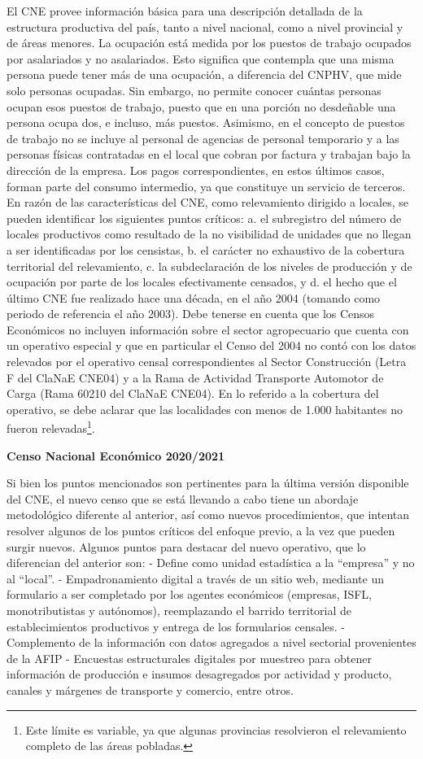 \documentclass[
  openany]{book}
\begin{document}
El CNE provee información básica para una descripción detallada de la estructura productiva del país, tanto a nivel nacional, como a nivel provincial y de áreas menores.
La ocupación está medida por los puestos de trabajo ocupados por asalariados y no asalariados.
Esto significa que contempla que una misma persona puede tener más de una ocupación, a diferencia del CNPHV, que mide solo personas ocupadas.
Sin embargo, no permite conocer cuántas personas ocupan esos puestos de trabajo, puesto que en una porción no desdeñable una persona ocupa dos, e incluso, más puestos.
Asimismo, en el concepto de puestos de trabajo no se incluye al personal de agencias de personal temporario y a las personas físicas contratadas en el local que cobran por factura y trabajan bajo la dirección de la empresa.
Los pagos correspondientes, en estos últimos casos, forman parte del consumo intermedio, ya que constituye un servicio de terceros.
En razón de las características del CNE, como relevamiento dirigido a locales, se pueden identificar los siguientes puntos críticos: a.
el subregistro del número de locales productivos como resultado de la no visibilidad de unidades que no llegan a ser identificadas por los censistas, b.
el carácter no exhaustivo de la cobertura territorial del relevamiento, c.
la subdeclaración de los niveles de producción y de ocupación por parte de los locales efectivamente censados, y d.
el hecho que el último CNE fue realizado hace una década, en el año 2004 (tomando como periodo de referencia el año 2003).
Debe tenerse en cuenta que los Censos Económicos no incluyen información sobre el sector agropecuario que cuenta con un operativo especial y que en particular el Censo del 2004 no contó con los datos relevados por el operativo censal correspondientes al Sector Construcción (Letra F del ClaNaE CNE04) y a la Rama de Actividad Transporte Automotor de Carga (Rama 60210 del ClaNaE CNE04).
En lo referido a la cobertura del operativo, se debe aclarar que las localidades con menos de 1.000 habitantes no fueron relevadas\footnote{Este límite es variable, ya que algunas provincias resolvieron el relevamiento completo de las áreas pobladas.}.

\textbf{Censo Nacional Económico 2020/2021}

Si bien los puntos mencionados son pertinentes para la última versión disponible del CNE, el nuevo censo que se está llevando a cabo tiene un abordaje metodológico diferente al anterior, así como nuevos procedimientos, que intentan resolver algunos de los puntos críticos del enfoque previo, a la vez que pueden surgir nuevos.
Algunos puntos para destacar del nuevo operativo, que lo diferencian del anterior son: - Define como unidad estadística a la ``empresa'' y no al ``local''.
- Empadronamiento digital a través de un sitio web, mediante un formulario a ser completado por los agentes económicos (empresas, ISFL, monotributistas y autónomos), reemplazando el barrido territorial de establecimientos productivos y entrega de los formularios censales.
- Complemento de la información con datos agregados a nivel sectorial provenientes de la AFIP - Encuestas estructurales digitales por muestreo para obtener información de producción e insumos desagregados por actividad y producto, canales y márgenes de transporte y comercio, entre otros.
\end{document}
